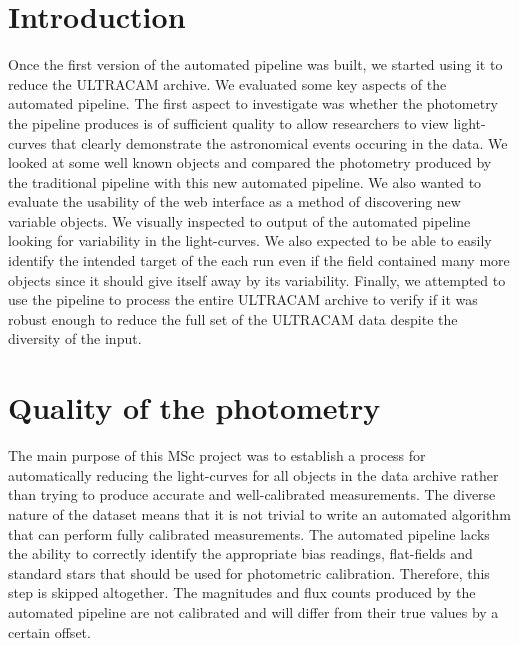 \section{Introduction}
Once the first version of the automated pipeline was built, we started using it to reduce the ULTRACAM archive. We evaluated some key aspects of the automated pipeline. The first aspect to investigate was whether the photometry the pipeline produces is of sufficient quality to allow researchers to view light-curves that clearly demonstrate the astronomical events occuring in the data. We looked at some well known objects and compared the photometry produced by the traditional pipeline with this new automated pipeline. We also wanted to evaluate the usability of the web interface as a method of discovering new variable objects. We visually inspected to output of the automated pipeline looking for variability in the light-curves. We also expected to be able to easily identify the  intended target of the each run even if the field contained many more objects since it should give itself away by its variability. Finally, we attempted to use the pipeline to process the entire ULTRACAM archive to verify if it was robust enough to reduce the full set of the ULTRACAM data despite the diversity of the input. 

\section{Quality of the photometry}
The main purpose of this MSc project was to establish a process for automatically reducing the light-curves for all objects in the data archive rather than trying to produce accurate and well-calibrated measurements. The diverse nature of the dataset means that it is not trivial to write an automated algorithm that can perform fully calibrated measurements. The automated pipeline lacks the ability to correctly identify the appropriate bias readings, flat-fields and standard stars that should be used for photometric calibration. Therefore, this step is skipped altogether. The magnitudes and flux counts produced by the automated pipeline are not calibrated and will differ from their true values by a certain offset. 

